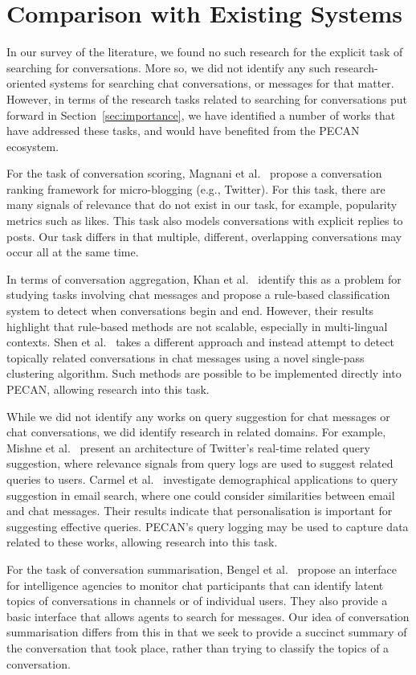 \vspace{-8pt}
\section{Comparison with Existing Systems}

In our survey of the literature, we found no such research for the explicit task of searching for conversations. More so, we did not identify any such research-oriented systems for searching chat conversations, or messages for that matter. However, in terms of the research tasks related to searching for conversations put forward in Section~\ref{sec:importance}, we have identified a number of works that have addressed these tasks, and would have benefited from the PECAN ecosystem.

For the task of conversation scoring, Magnani et al.~\cite{magnani2012conversation} propose a conversation ranking framework for micro-blogging (e.g., Twitter). For this task, there are many signals of relevance that do not exist in our task, for example, popularity metrics such as likes. This task also models conversations with explicit replies to posts. Our task differs in that multiple, different, overlapping conversations may occur all at the same time.

In terms of conversation aggregation, Khan et al.~\cite{khan2002mining} identify this as a problem for studying tasks involving chat messages and propose a rule-based classification system to detect when conversations begin and end. However, their results highlight that rule-based methods are not scalable, especially in multi-lingual contexts. Shen et al.~\cite{shen2006thread} takes a different approach and instead attempt to detect topically related conversations in chat messages using a novel single-pass clustering algorithm. Such methods are possible to be implemented directly into PECAN, allowing research into this task.

While we did not identify any works on query suggestion for chat messages or chat conversations, we did identify research in related domains. For example, Mishne et al.~\cite{mishne2013fast} present an architecture of Twitter's real-time related query suggestion, where relevance signals from query logs are used to suggest related queries to users. Carmel et al.~\cite{carmel2017demographics} investigate demographical applications to query suggestion in email search, where one could consider similarities between email and chat messages. Their results indicate that personalisation is important for suggesting effective queries. PECAN's query logging may be used to capture data related to these works, allowing research into this task.

For the task of conversation summarisation, Bengel et al.~\cite{bengel2004chattrack} propose an interface for intelligence agencies to monitor chat participants that can identify latent topics of conversations in channels or of individual users. They also provide a basic interface that allows agents to search for messages. Our idea of conversation summarisation differs from this in that we seek to provide a succinct summary of the conversation that took place, rather than trying to classify the topics of a conversation. 
